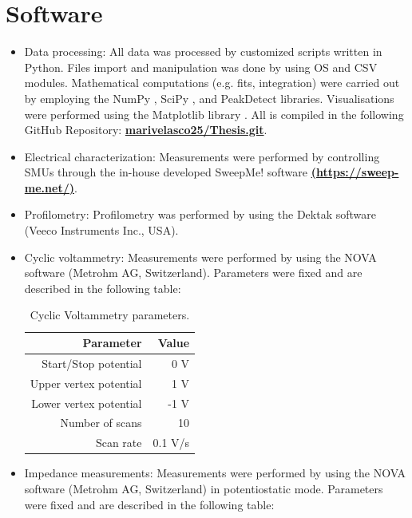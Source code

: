 \section{Software} \label{param}
\begin{itemize}
\item Data processing: All data was processed by customized scripts written in Python. Files import and manipulation was done by using OS \cite{os_module} and CSV \cite{csv_module} modules. Mathematical computations (e.g. fits, integration) were carried out by employing the NumPy \cite{numpy_2012}, SciPy \cite{scipy_linreg}, and PeakDetect \cite{peakdetect} libraries. Visualisations were performed using the Matplotlib library \cite{matplotlib_2012}. All is compiled in the following GitHub Repository: \href{https://github.com/marivelascoe25/Thesis.git}{\textbf{marivelasco25/Thesis.git}}.
\item Electrical characterization: Measurements were performed by controlling SMUs through the in-house developed SweepMe! software \href{https://sweep-me.net/}{\textbf{(https://sweep-me.net/)}}. 
\item Profilometry: Profilometry was performed by using the Dektak software (Veeco Instruments Inc., USA).
\item Cyclic voltammetry: Measurements were performed by using the NOVA software (Metrohm AG, Switzerland). Parameters were fixed and are described in the following table: 

\begin{table}[ht]
	\centering
	\caption{Cyclic Voltammetry parameters.}
	\begin{tabular}{r r} \hline
		Parameter	& Value \\ \hline
		Start/Stop potential	& 0 V \\ 
		Upper vertex potential	& 1 V \\ 
		Lower vertex potential	& -1 V \\ 
		Number of scans	& 10 \\ 
		Scan rate	& 0.1 V/s \\ \hline
	\end{tabular}
	\label{tab:CV}
\end{table}

\item Impedance measurements: Measurements were performed by using the NOVA software (Metrohm AG, Switzerland) in potentiostatic mode. Parameters were fixed and are described in the following table: 


\end{itemize}
